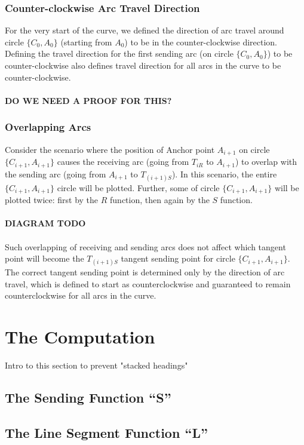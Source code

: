 \documentclass{article}
\begin{document}
\subsubsection{Counter-clockwise Arc Travel Direction}
For the very start of the curve, we defined the direction of arc travel around circle $\{C_0, A_0\}$ (starting from $A_0$) to be in the counter-clockwise direction.
Defining the travel direction for the first sending arc (on circle $\{C_0, A_0\}$) to be counter-clockwise also defines travel direction for all arcs in the curve to be counter-clockwise.\\ \\

\textbf{DO WE NEED A PROOF FOR THIS?} \\

\subsubsection{Overlapping Arcs}
Consider the scenario where the position of Anchor point $A_{i+1}$ on circle $\{C_{i+1}, A_{i+1}\}$ causes the receiving arc (going from $T_{iR}$ to $A_{i+1}$) to overlap with the sending arc (going from $A_{i+1}$ to $T_{(i+1)S}$). In this scenario, the entire $\{C_{i+1}, A_{i+1}\}$ circle will be plotted. Further, some of circle $\{C_{i+1}, A_{i+1}\}$ will be plotted twice: first by the $R$ function, then again by the $S$ function.\\ \\
\textbf{DIAGRAM TODO}\\ \\
Such overlapping of receiving and sending arcs does not affect which tangent point will become the $T_{(i+1)S}$ tangent sending point for circle $\{C_{i+1}, A_{i+1}\}$. The correct tangent sending point is determined only by the direction of arc travel, which is defined to start as counterclockwise and guaranteed to remain counterclockwise for all arcs in the curve.

\section{The Computation}
Intro to this section to prevent "stacked headings"
\subsection{The Sending Function “S”}

\subsection{The Line Segment Function “L”}
\end{document}
